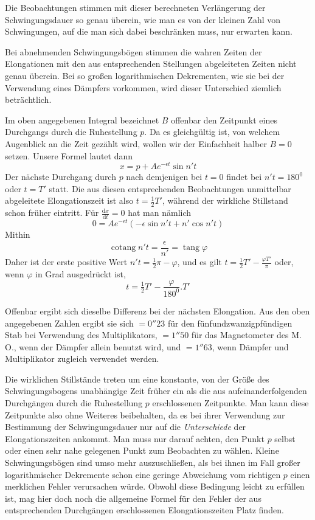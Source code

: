 Die Beobachtungen stimmen mit dieser berechneten Verlängerung der Schwingungsdauer so genau überein, wie man es von der kleinen Zahl von Schwingungen, auf die man sich dabei beschränken muss, nur erwarten kann.

Bei abnehmenden Schwingungsbögen stimmen die wahren Zeiten der Elongationen mit den aus entsprechenden Stellungen abgeleiteten Zeiten nicht genau überein. Bei so großen logarithmischen Dekrementen, wie sie bei der Verwendung eines Dämpfers vorkommen, wird dieser Unterschied ziemlich beträchtlich.

Im oben angegebenen Integral bezeichnet $B$ offenbar den Zeitpunkt eines Durchgangs durch die Ruhestellung $p$. Da es gleichgültig ist, von welchem Augenblick an die Zeit gezählt wird, wollen wir der Einfachheit halber $B=0$ setzen. Unsere Formel lautet dann
\[
x=p+Ae^{-\epsilon t}\sin n't
\]
Der nächste Durchgang durch $p$ nach demjenigen bei $t=0$ findet bei $n't=180^0$ oder $t=T'$ statt. Die aus diesen entsprechenden Beobachtungen unmittelbar abgeleitete Elongationszeit ist also $t=\tfrac12T'$, während der wirkliche Stillstand schon früher eintritt. Für $\frac{\mathrm{d}x}{\mathrm{d}t}=0$ hat man nämlich
\[
0=Ae^{-\epsilon t}(-\epsilon\sin n't+n'\cos n't)
\]
Mithin
\[
\operatorname{cotang}n't=\frac{\epsilon}{n'}=\operatorname{tang}\varphi
\]
Daher ist der erste positive Wert $n't=\tfrac12\pi-\varphi$, und es gilt $t=\tfrac12T'-\frac{\varphi T'}{\pi}$ oder, wenn $\varphi$ in Grad ausgedrückt ist,
\[
t=\tfrac12T'-\frac{\varphi}{180^0}.T'
\]

Offenbar ergibt sich dieselbe Differenz bei der nächsten Elongation. Aus den oben angegebenen Zahlen ergibt sie sich $=0''23$ für den fünfundzwanzigpfündigen Stab bei Verwendung des Multiplikators, $=1''50$ für das Magnetometer des M. O., wenn der Dämpfer allein benutzt wird, und $=1''63$, wenn Dämpfer und Multiplikator zugleich verwendet werden.

Die wirklichen Stillstände treten um eine konstante, von der Größe des Schwingungsbogens unabhängige Zeit früher ein als die aus aufeinanderfolgenden Durchgängen durch die Ruhestellung $p$ erschlossenen Zeitpunkte. Man kann diese Zeitpunkte also ohne Weiteres beibehalten, da es bei ihrer Verwendung zur Bestimmung der Schwingungsdauer nur auf die \textit{Unterschiede} der Elongationszeiten ankommt. Man muss nur darauf achten, den Punkt $p$ selbst oder einen sehr nahe gelegenen Punkt zum Beobachten zu wählen. Kleine Schwingungsbögen sind umso mehr auszuschließen, als bei ihnen im Fall großer logarithmischer Dekremente schon eine geringe Abweichung vom richtigen $p$ einen merklichen Fehler verursachen würde. Obwohl diese Bedingung leicht zu erfüllen ist, mag hier doch noch die allgemeine Formel für den Fehler der aus entsprechenden Durchgängen erschlossenen Elongationszeiten Platz finden.

